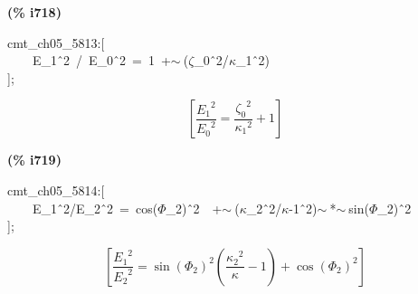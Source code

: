 \documentclass[fleqn]{article}
\begin{document}
\noindent
\begin{minipage}[t]{4.000000em}\color{red}\bfseries
(\% i718)	
\end{minipage}
\begin{minipage}[t]{\textwidth}\color{blue}
cmt\_ch05\_5813:[\\
\ \ \ \ E\_1\^\ 2\ /\ E\_0\^\ 2\ =\ 1\ +\ensuremath{\sim\ }(\ensuremath{\zeta}\_0\^\ 2/\ensuremath{\kappa}\_1\^\ 2)\\
];
\end{minipage}
\[\displaystyle \tag{\% o718} 
\left[ \frac{{{{E_1}}^{2}}}{{{{E_0}}^{2}}}=\frac{{{{{\zeta }_0}}^{2}}}{{{{{\kappa }_1}}^{2}}}+1\right] \mbox{}
\]


\noindent
\begin{minipage}[t]{4.000000em}\color{red}\bfseries
(\% i719)	
\end{minipage}
\begin{minipage}[t]{\textwidth}\color{blue}
cmt\_ch05\_5814:[\\
\ \ \ \ E\_1\^\ 2/E\_2\^\ 2\ =\ cos(\ensuremath{\Phi}\_2)\^\ 2\ \ +\ensuremath{\sim\ }(\ensuremath{\kappa}\_2\^\ 2/\ensuremath{\kappa}-1\^\ 2)\ensuremath{\sim\ }*\ensuremath{\sim\ }sin(\ensuremath{\Phi}\_2)\^\ 2\\
];
\end{minipage}
\[\displaystyle \tag{\% o719} 
\left[ \frac{{{{E_1}}^{2}}}{{{{E_2}}^{2}}}={{\sin{\left( {{\Phi }_2}\right) }}^{2}} \left( \frac{{{{{\kappa }_2}}^{2}}}{\kappa }-1\right) +{{\cos{\left( {{\Phi }_2}\right) }}^{2}}\right] \mbox{}
\]
\end{document}

